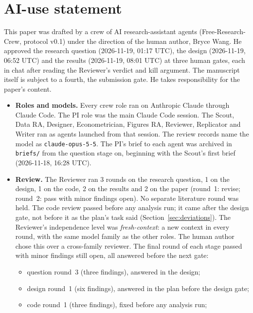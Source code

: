 \section*{AI-use statement}

This paper was drafted by a crew of AI research-assistant agents
(Free-Research-Crew, protocol v0.1) under the direction of the human author, Bryce Wang.
He approved the research question (2026-11-19, 01:17 UTC), the design (2026-11-19,
06:52 UTC) and the results (2026-11-19, 08:01 UTC) at three human gates, each in chat after
reading the Reviewer's verdict and kill argument. The manuscript itself is subject to a
fourth, the submission gate. He takes responsibility for the paper's content.

\begin{itemize}
  \item \textbf{Roles and models.} Every crew role ran on Anthropic Claude through Claude
        Code. The PI role was the main Claude Code session. The Scout, Data RA, Designer,
        Econometrician, Figures RA, Reviewer, Replicator and Writer ran as agents launched
        from that session. The review records name the model as
        \texttt{claude-opus-5-5}. The PI's brief to each agent was archived in
        \texttt{briefs/} from the question stage on, beginning with the Scout's first brief
        (2026-11-18, 16:28 UTC).
  \item \textbf{Review.} The Reviewer ran 3 rounds on the research question, 1 on the
        design, 1 on the code, 2 on the results and 2 on the paper (round~1: revise; round~2: pass with minor
        findings open). No separate
        literature round was held. The code review passed before any analysis run; it came after the design gate, not
        before it as the plan's task said (Section~\ref{sec:deviations}). The
        Reviewer's independence level was \emph{fresh-context}: a new context in every
        round, with the same model family as the other roles. The human author chose this
        over a cross-family reviewer. The final round of each stage passed with minor
        findings still open, all answered before the next gate:
        \begin{itemize}
          \item question round~3 (three findings), answered in the design;
          \item design round~1 (six findings), answered in the plan before the design gate;
          \item code round~1 (three findings), fixed before any analysis run;

\end{itemize}
\end{itemize}
